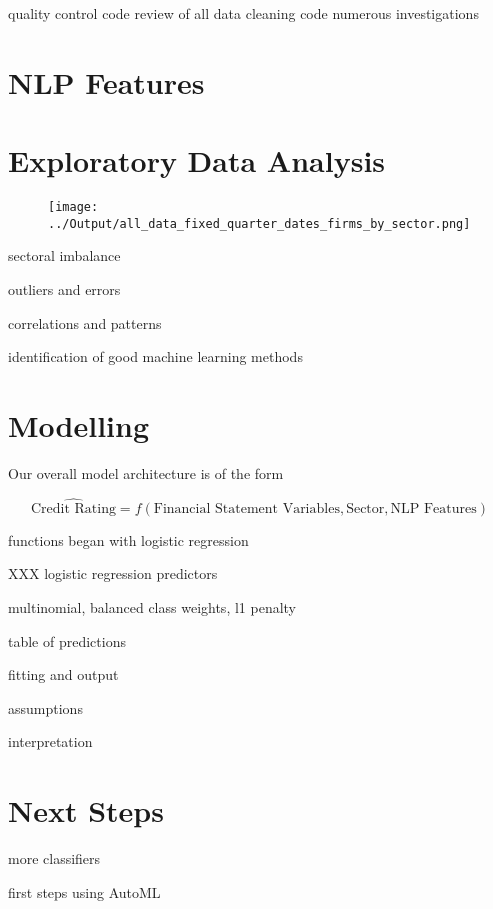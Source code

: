 \documentclass{article}
\begin{document}
    quality control
    code review of all data cleaning code
    numerous investigations

    \section*{NLP Features}

    \section*{Exploratory Data Analysis}

	\begin{figure}[h!]
		\centering
        \texttt{[image: ../Output/all\_data\_fixed\_quarter\_dates\_firms\_by\_sector.png]}
	\end{figure}

    sectoral imbalance

    outliers and errors

    correlations and patterns

    identification of good machine learning methods

    \section*{Modelling}

    Our overall model architecture is of the form

    \begin{equation*}
        \hat{\text{Credit Rating}} = f(\text{Financial Statement Variables}, \text{Sector}, \text{NLP Features})
    \end{equation*}

    functions began with logistic regression

    XXX logistic regression predictors

    multinomial, balanced class weights, l1 penalty

    table of predictions

    fitting and output

    assumptions
    
    interpretation

    \section*{Next Steps}

    more classifiers
    
    first steps using AutoML
\end{document}
